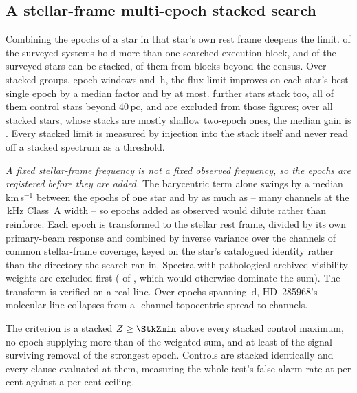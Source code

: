 \subsection{A stellar-frame multi-epoch stacked search}
\label{sec:stack}

Combining the epochs of a star in that star's own rest frame deepens the
limit. \EpMulti{} of the \NSystems{} surveyed systems hold more than one
searched execution block, and \SxStkStarCensus{} of the surveyed stars can be
stacked, \SttNStkOneEb{} of them from blocks beyond the census. Over \SyStkNGroup{} stacked groups, \SyStkNEpochComb{} epoch-windows and
\SyStkHours\,h, the flux limit improves on each star's best single epoch by a
median factor \SyStkGainMed{} and by \SyStkGainMax{} at most.
\SxStkStarOutside{} further stars stack too, all of them control stars beyond
40\,pc, and are excluded from those figures; over all \StkNStar{} stacked
stars, whose stacks are mostly shallow two-epoch ones, the median gain is
\StkLimitGainMed. Every
stacked limit is measured by injection into the stack itself and never read
off a stacked spectrum as a threshold.

\emph{A fixed stellar-frame frequency is not a fixed observed frequency, so
the epochs are registered before they are added.} The barycentric term alone
swings by a median \StkVcorrSwingMed\,km\,s$^{-1}$ between the epochs of one
star and by as much as \StkVcorrSwingMax{} -- many channels at the
\StkRefChanKHz\,kHz Class~A width -- so epochs added as observed would dilute
rather than reinforce. Each epoch is transformed to the stellar rest frame,
divided by its own primary-beam response and combined by inverse variance
over the channels of common stellar-frame coverage, keyed on the star's
catalogued identity rather than the directory the search ran in. Spectra with
pathological archived visibility weights are excluded first
(\StkBadWeight{} of \StkNProd, which would otherwise dominate the sum). The transform is verified on a real line. Over \StkRegNEpoch{} epochs
spanning \StkRegSpanD\,d, HD~285968's molecular line collapses from a
\StkRegTopoChan-channel topocentric spread to \StkRegStellarChan{}
channels.

The criterion is a stacked
$Z\ge\StkZmin$ above every stacked control maximum, no epoch supplying more
than \StkDomMax{} of the weighted sum, and at least \StkJkMin{} of the signal
surviving removal of the strongest epoch. Controls are stacked identically
and every clause evaluated at them, measuring the whole test's
false-alarm rate at \StkCtrlFap{} per cent against a \StkFapCeil{} per cent
ceiling.

